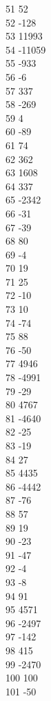 { 51	52 \\
 52	-128 \\
 53	11993 \\
 54	-11059 \\
 55	-933 \\
 56	-6 \\
 57	337 \\
 58	-269 \\
 59	4 \\
 60	-89 \\
 61	74 \\
 62	362 \\
 63	1608 \\
 64	337 \\
 65	-2342 \\
 66	-31 \\
 67	-39 \\
 68	80 \\
 69	-4 \\
 70	19 \\
 71	25 \\
 72	-10 \\
 73	10 \\
 74	-74 \\
 75	88 \\
 76	-50 \\
 77	4946 \\
 78	-4991 \\
 79	-29 \\
 80	4767 \\
 81	-4640 \\
 82	-25 \\
 83	-19 \\
 84	27 \\
 85	4435 \\
 86	-4442 \\
 87	-76 \\
 88	57 \\
 89	19 \\
 90	-23 \\
 91	-47 \\
 92	-4 \\
 93	-8 \\
 94	91 \\
 95	4571 \\
 96	-2497 \\
 97	-142 \\
 98	415 \\
 99	-2470 \\
 100	100 \\
 101	-50 \\
}
